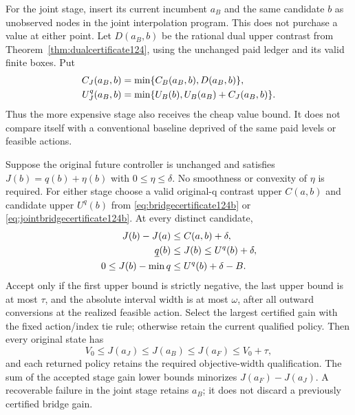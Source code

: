 For the joint stage, insert its current incumbent $a_B$ and the same
candidate $b$ as unobserved nodes in the joint interpolation program.
This does not purchase a value at either point. Let $D(a_B,b)$ be
the rational dual upper contrast from
Theorem~\ref{thm:dualcertificate124}, using the unchanged paid
ledger and its valid finite boxes. Put
\begin{align}
 C_J(a_B,b)&=\min\{C_B(a_B,b),D(a_B,b)\},\notag\\
 U_J^q(a_B,b)&=\min\{U_B(b),U_B(a_B)+C_J(a_B,b)\}.
 \label{eq:jointbridgecertificate124b}
\end{align}
Thus the more expensive stage also receives the cheap value bound.
It does not compare itself with a conventional baseline deprived of
the same paid levels or feasible actions.

\begin{theorem}
\label{thm:stagedpolicy124b}
Suppose the original future controller is unchanged and satisfies
$J(b)=q(b)+\eta(b)$ with $0\le\eta\le\delta$. No smoothness or
convexity of $\eta$ is required. For either stage choose a valid
original-q contrast upper $C(a,b)$ and candidate upper $U^q(b)$
from \eqref{eq:bridgecertificate124b} or
\eqref{eq:jointbridgecertificate124b}. At every distinct candidate,
\begin{align}
 J(b)-J(a)&\le C(a,b)+\delta,\notag\\
 \underline q(b)&\le J(b)\le U^q(b)+\delta,\notag\\
 0\le J(b)-\min q&\le U^q(b)+\delta-B.
 \label{eq:stagedqualification124b}
\end{align}
Accept only if the first upper bound is strictly negative, the
last upper bound is at most $\tau$, and the absolute interval width
is at most $\omega$, after all outward conversions at the realized
feasible action. Select the largest certified gain with the fixed
action/index tie rule; otherwise retain the current qualified policy.
Then every original state has
\begin{equation}\label{eq:stagedorder124b}
 V_0\le J(a_J)\le J(a_B)\le J(a_F)\le V_0+\tau,
\end{equation}
and each returned policy retains the required objective-width
qualification. The sum of the accepted stage gain lower bounds
minorizes $J(a_F)-J(a_J)$. A recoverable failure in the joint stage
retains $a_B$; it does not discard a previously certified bridge gain.
\end{theorem}

